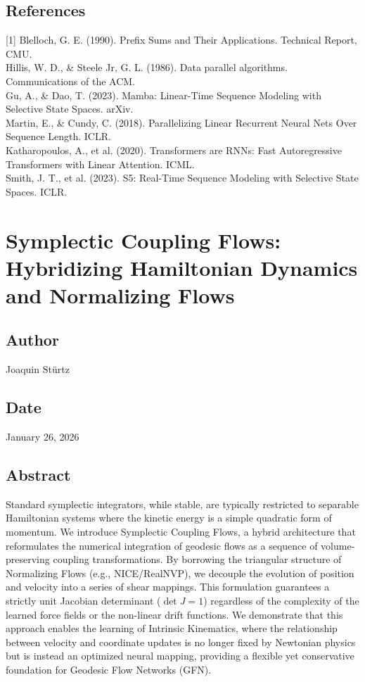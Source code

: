 \documentclass{article}
\numberwithin{equation}{section}
\begin{document}
\subsection*{References}
[1] Blelloch, G. E. (1990). Prefix Sums and Their Applications. Technical Report, CMU.\\
[2] Hillis, W. D., \& Steele Jr, G. L. (1986). Data parallel algorithms. Communications of the ACM.\\
[3] Gu, A., \& Dao, T. (2023). Mamba: Linear-Time Sequence Modeling with Selective State Spaces. arXiv.\\
[4] Martin, E., \& Cundy, C. (2018). Parallelizing Linear Recurrent Neural Nets Over Sequence Length. ICLR.\\
[5] Katharopoulos, A., et al. (2020). Transformers are RNNs: Fast Autoregressive Transformers with Linear Attention. ICML.\\
[6] Smith, J. T., et al. (2023). S5: Real-Time Sequence Modeling with Selective State Spaces. ICLR.

\section{Symplectic Coupling Flows: Hybridizing Hamiltonian Dynamics and Normalizing Flows}
\subsection*{Author}
Joaquin Stürtz
\subsection*{Date}
January 26, 2026
\subsection*{Abstract}
Standard symplectic integrators, while stable, are typically restricted to separable Hamiltonian systems where the kinetic energy is a simple quadratic form of momentum. We introduce Symplectic Coupling Flows, a hybrid architecture that reformulates the numerical integration of geodesic flows as a sequence of volume-preserving coupling transformations. By borrowing the triangular structure of Normalizing Flows (e.g., NICE/RealNVP), we decouple the evolution of position and velocity into a series of shear mappings. This formulation guarantees a strictly unit Jacobian determinant ($\det J = 1$) regardless of the complexity of the learned force fields or the non-linear drift functions. We demonstrate that this approach enables the learning of Intrinsic Kinematics, where the relationship between velocity and coordinate updates is no longer fixed by Newtonian physics but is instead an optimized neural mapping, providing a flexible yet conservative foundation for Geodesic Flow Networks (GFN).
\end{document}
